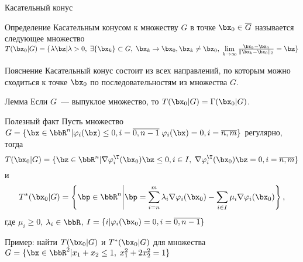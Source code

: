 \documentclass[12pt]{beamer}
\begin{document}
\begin{frame}{Касательный конус}
\begin{block}{Определение}
Касательным конусом к множеству $G$ в точке $\bx_0 \in \overline{G}$ называется следующее множество $T(\bx_0 |G) = \{ \lambda \bz | \lambda > 0, \; \exists \{\bx_k\} \subset G, \; \bx_k \rightarrow \bx_0, \bx_k \neq \bx_0, \; \lim\limits_{k \rightarrow \infty} \frac{\bx_k - \bx_0}{\|\bx_k - \bx_0\|_2} = \bz \}$
\end{block}

\begin{block}{Пояснение}
Касательный конус состоит из всех направлений, по которым можно сходиться к точке $\bx_0$ по последовательностям из множества $G$.
\end{block}

\begin{block}{Лемма}
Если $G$~--- выпуклое множество, то $T(\bx_0|G) = \Gamma(\bx_0|G)$.
\end{block}
\end{frame}

\begin{frame}{Полезный факт}
Пусть множество $G = \{\bx \in \bbR^n | \varphi_i(\bx) \leq 0, i = \overline{0, n-1} \; \varphi_i(\bx) = 0, i = \overline{n, m} \}$ регулярно, тогда \vspace{-4mm}
\[
T(\bx_0|G) = \{ \bz \in \bbR^n | \nabla \varphi^{\T}_i(\bx_0)\bz \leq 0, i \in I, \; \nabla \varphi^{\T}_i(\bx_0)\bz = 0, i = \overline{n,m} \}
\vspace{-4mm}
\]
и \vspace{-4mm}
\[
T^*(\bx_0|G) = \left \{ \bp \in \bbR^n \middle| \bp = \sum\limits_{i = n}^m \lambda_i \nabla \varphi_i(\bx_0) - \sum\limits_{i \in I} \mu_i \nabla \varphi_i(\bx_0) \right \},
\] 
где $\mu_i \geq 0$, $\lambda_i \in \bbR$, $I = \{i | \varphi_i(\bx_0) = 0, i = \overline{0, n-1} \}$

Пример: найти $T(\bx_0|G)$ и $T^*(\bx_0|G)$ для множества $G = \{\bx \in \bbR^2 | x_1 + x_2 \leq 1, \; x^2_1 + 2x_2^2 = 1 \}$
\end{frame}
\end{document}
